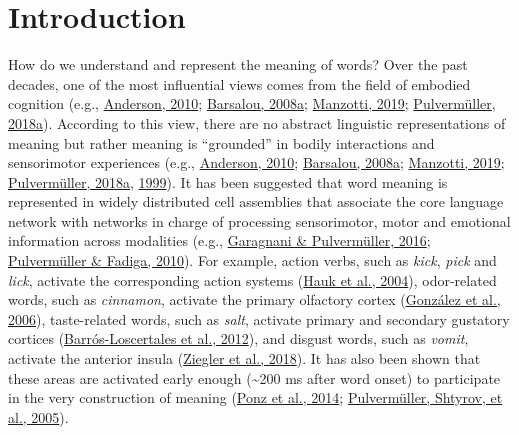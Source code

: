 \documentclass[
  a4paper,12pt,twoside,onecolumn,openright,final,oldfontcommands]{memoir}
\begin{document}
\hypertarget{introduction}{%
\section{Introduction}\label{introduction}}

How do we understand and represent the meaning of words? Over the past decades, one of the most influential views comes from the field of embodied cognition (e.g., \protect\hyperlink{ref-anderson_neural_2010}{Anderson, 2010}; \protect\hyperlink{ref-barsalou_grounded_2008}{Barsalou, 2008a}; \protect\hyperlink{ref-manzotti_embodied_2019}{Manzotti, 2019}; \protect\hyperlink{ref-pulvermuller_neural_2018}{Pulvermüller, 2018a}). According to this view, there are no abstract linguistic representations of meaning but rather meaning is ``grounded'' in bodily interactions and sensorimotor experiences (e.g., \protect\hyperlink{ref-anderson_neural_2010}{Anderson, 2010}; \protect\hyperlink{ref-barsalou_grounded_2008}{Barsalou, 2008a}; \protect\hyperlink{ref-manzotti_embodied_2019}{Manzotti, 2019}; \protect\hyperlink{ref-pulvermuller_neural_2018}{Pulvermüller, 2018a}, \protect\hyperlink{ref-pulvermuller_words_1999}{1999}). It has been suggested that word meaning is represented in widely distributed cell assemblies that associate the core language network with networks in charge of processing sensorimotor, motor and emotional information across modalities (e.g., \protect\hyperlink{ref-garagnani_conceptual_2016}{Garagnani \& Pulvermüller, 2016}; \protect\hyperlink{ref-pulvermuller_active_2010}{Pulvermüller \& Fadiga, 2010}). For example, action verbs, such as \emph{kick}, \emph{pick} and \emph{lick}, activate the corresponding action systems (\protect\hyperlink{ref-hauk_somatotopic_2004}{Hauk et al., 2004}), odor-related words, such as \emph{cinnamon}, activate the primary olfactory cortex (\protect\hyperlink{ref-gonzalez_reading_2006}{González et al., 2006}), taste-related words, such as \emph{salt}, activate primary and secondary gustatory cortices (\protect\hyperlink{ref-barros-loscertales_reading_2012}{Barrós-Loscertales et al., 2012}), and disgust words, such as \emph{vomit}, activate the anterior insula (\protect\hyperlink{ref-ziegler_words_2018}{Ziegler et al., 2018}). It has also been shown that these areas are activated early enough (\textasciitilde200 ms after word onset) to participate in the very construction of meaning (\protect\hyperlink{ref-ponz_emotion_2014}{Ponz et al., 2014}; \protect\hyperlink{ref-pulvermuller_brain_2005-1}{Pulvermüller, Shtyrov, et al., 2005}).
\end{document}
